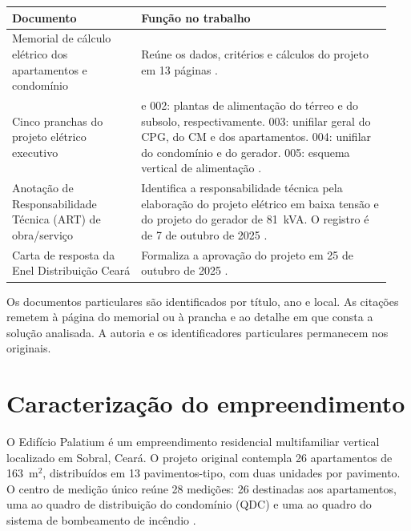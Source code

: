 \par\noindent
\begin{minipage}{\linewidth}
  \label{qua:fontes-palatium}
  \vspace{0.7\baselineskip}
  \centering
  {\small
  \renewcommand{\arraystretch}{1.2}
  \begin{tabular}{|>{\raggedright\arraybackslash}p{0.32\linewidth}|>{\raggedright\arraybackslash}p{0.62\linewidth}|}
    \hline
    \textbf{Documento} & \textbf{Função no trabalho} \\\hline
    Memorial de cálculo elétrico dos apartamentos e condomínio & Reúne os dados, critérios e cálculos do projeto em 13 páginas \cite{palatiummemorial2025}. \\\hline
    Cinco pranchas do projeto elétrico executivo & 001 e 002: plantas de alimentação do térreo e do subsolo, respectivamente. 003: unifilar geral do CPG, do CM e dos apartamentos. 004: unifilar do condomínio e do gerador. 005: esquema vertical de alimentação \cite[pranchas~001--005]{palatiumpranchas2025}. \\\hline
    Anotação de Responsabilidade Técnica (ART) de obra/serviço & Identifica a responsabilidade técnica pela elaboração do projeto elétrico em baixa tensão e do projeto do gerador de 81~kVA. O registro é de 7 de outubro de 2025 \cite[p.~1, item~4]{palatiumart2025}. \\\hline
    Carta de resposta da Enel Distribuição Ceará & Formaliza a aprovação do projeto em 25 de outubro de 2025 \cite{enelaprovacao2025}. \\\hline
  \end{tabular}
  }
\end{minipage}
\par

Os documentos particulares são identificados por título, ano e local. As citações remetem à página do memorial ou à prancha e ao detalhe em que consta a solução analisada. A autoria e os identificadores particulares permanecem nos originais.

\section{Caracterização do empreendimento}
\label{sec:caracterizacao-empreendimento}

O Edifício Palatium é um empreendimento residencial multifamiliar vertical localizado em Sobral, Ceará. O projeto original contempla 26 apartamentos de 163~\(\mathrm{m}^2\), distribuídos em 13 pavimentos-tipo, com duas unidades por pavimento. O centro de medição único reúne 28 medições: 26 destinadas aos apartamentos, uma ao quadro de distribuição do condomínio (QDC) e uma ao quadro do sistema de bombeamento de incêndio \cite[p.~1 e~5]{palatiummemorial2025}.

